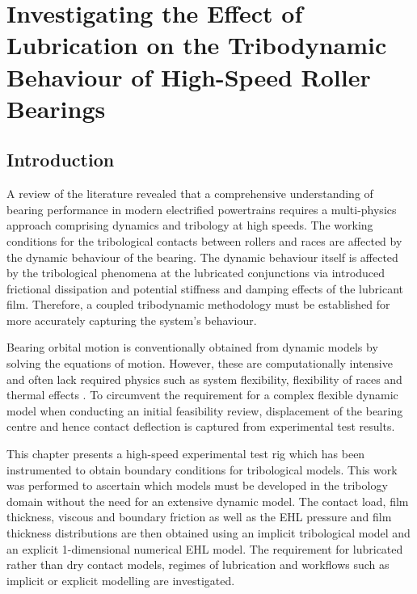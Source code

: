 \chapter{Investigating the Effect of Lubrication on the Tribodynamic Behaviour of High-Speed Roller Bearings}
\label{Investigating the Effect of Lubrication on the Tribodynamic Behaviour of High-Speed Roller Bearings}

\section{Introduction}

A review of the literature revealed that a comprehensive understanding of bearing performance in modern electrified powertrains requires a multi-physics approach comprising dynamics and tribology at high speeds. The working conditions for the tribological contacts between rollers and races are affected by the dynamic behaviour of the bearing. The dynamic behaviour itself is affected by the tribological phenomena at the lubricated conjunctions via introduced frictional dissipation and potential stiffness \cite{Hao2020} \cite{Akemi2020} and damping effects of the lubricant film. Therefore, a coupled tribodynamic methodology must be established for more accurately capturing the system’s behaviour.

Bearing orbital motion is conventionally obtained from dynamic models by solving the equations of motion. However, these are computationally intensive and often lack required physics such as system flexibility, flexibility of races and thermal effects \cite{Matsubara1988} \cite{Wang2015} \cite{Liu2017c}. To circumvent the requirement for a complex flexible dynamic model when conducting an initial feasibility review, displacement of the bearing centre and hence contact deflection is captured from experimental test results.

This chapter presents a high-speed experimental test rig which has been instrumented to obtain boundary conditions for tribological models. This work was performed to ascertain which models must be developed in the tribology domain without the need for an extensive dynamic model. The contact load, film thickness, viscous and boundary friction as well as the EHL pressure and film thickness distributions are then obtained using an implicit tribological model and an explicit 1-dimensional numerical EHL model. The requirement for lubricated rather than dry contact models, regimes of lubrication and workflows such as implicit or explicit modelling are investigated.

